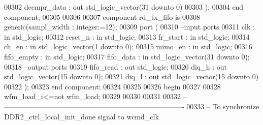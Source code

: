 \begin{DoxyCode}
00302             decmpr_data   : \textcolor{keywordflow}{out} \textcolor{comment}{std\_logic\_vector}(\textcolor{vhdllogic}{}\textcolor{vhdllogic}{31} \textcolor{keywordflow}{downto} \textcolor{vhdllogic}{}\textcolor{vhdllogic}{0})    
00303         );
00304 \textcolor{keywordflow}{end} \textcolor{keywordflow}{component};
00305 
00306 
00307 \textcolor{keywordflow}{component} rd_tx_fifo \textcolor{keywordflow}{is}
00308   \textcolor{keywordflow}{generic}(sampl_width : \textcolor{comment}{integer}:=\textcolor{vhdllogic}{}\textcolor{vhdllogic}{12});
00309   \textcolor{keywordflow}{port} (
00310 \textcolor{keyword}{        --input ports }
00311       clk           : \textcolor{keywordflow}{in} \textcolor{comment}{std\_logic};
00312       reset_n       : \textcolor{keywordflow}{in} \textcolor{comment}{std\_logic};
00313       fr_start      : \textcolor{keywordflow}{in} \textcolor{comment}{std\_logic};
00314       ch_en         : \textcolor{keywordflow}{in} \textcolor{comment}{std\_logic\_vector}(\textcolor{vhdllogic}{}\textcolor{vhdllogic}{1} \textcolor{keywordflow}{downto} \textcolor{vhdllogic}{}\textcolor{vhdllogic}{0});
00315       mimo_en       : \textcolor{keywordflow}{in} \textcolor{comment}{std\_logic};
00316       fifo_empty    : \textcolor{keywordflow}{in} \textcolor{comment}{std\_logic};
00317       fifo_data : \textcolor{keywordflow}{in} \textcolor{comment}{std\_logic\_vector}(\textcolor{vhdllogic}{}\textcolor{vhdllogic}{31} \textcolor{keywordflow}{downto} \textcolor{vhdllogic}{}\textcolor{vhdllogic}{0});
00318 \textcolor{keyword}{        --output ports }
00319       fifo_read : \textcolor{keywordflow}{out} \textcolor{comment}{std\_logic};
00320       diq_h         : \textcolor{keywordflow}{out} \textcolor{comment}{std\_logic\_vector}(\textcolor{vhdllogic}{}\textcolor{vhdllogic}{15} \textcolor{keywordflow}{downto} \textcolor{vhdllogic}{}\textcolor{vhdllogic}{0});
00321       diq_l         : \textcolor{keywordflow}{out} \textcolor{comment}{std\_logic\_vector}(\textcolor{vhdllogic}{}\textcolor{vhdllogic}{15} \textcolor{keywordflow}{downto} \textcolor{vhdllogic}{}\textcolor{vhdllogic}{0})
00322         );
00323 \textcolor{keywordflow}{end} \textcolor{keywordflow}{component};
00324 
00325   
00326 \textcolor{vhdlkeyword}{begin}
00327 
00328 \textcolor{vhdlchar}{wfm_load_i}\textcolor{vhdlchar}{<=}\textcolor{keywordflow}{not} \textcolor{vhdlchar}{wfm_load};
00329 
00330 
00331 
00332 \textcolor{keyword}{-- ----------------------------------------------------------------------------}
00333 \textcolor{keyword}{-- To synchronize DDR2\_ctrl\_local\_init\_done signal to wcmd\_clk}

\end{DoxyCode}
